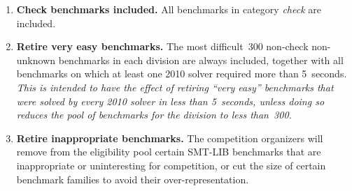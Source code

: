 \documentclass[12pt]{article}
\begin{document}
\begin{enumerate}

\item \textbf{Check benchmarks included.} %
  All benchmarks in category \emph{check} are included.

\item \textbf{Retire very easy benchmarks.} %
  The most difficult~300 non-check non-unknown benchmarks in each
  division are always included, together with all benchmarks on which
  at least one 2010 solver required more than 5~seconds.  \emph{This
    is intended to have the effect of retiring ``very easy''
    benchmarks that were solved by every 2010 solver in less
    than 5~seconds, \emph{unless} doing so reduces the pool of
    benchmarks for the division to less than~300.}

\item \textbf{Retire inappropriate benchmarks.} %
  The competition organizers will remove from the eligibility pool
  certain SMT-LIB benchmarks that are inappropriate or uninteresting
  for competition, or cut the size of certain benchmark families to
  avoid their over-representation.


\end{enumerate}
\end{document}
